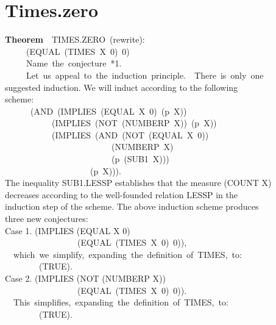 \documentclass[10pt]{book}
\newenvironment{pubasis}{\begin{flushleft}}{\end{flushleft}}
\newcommand{\axiomordefinition}[1]{\vspace{6pt}\Large\textsf{\textbf{#1}}\normalsize}
\begin{document}
\section{Times.zero}
\begin{pubasis}
\axiomordefinition{Theorem}~~TIMES.ZERO~(rewrite):\\
~~~~~(EQUAL~(TIMES~X~0)~0)\\

~~~~~Name~the~conjecture~*1.\\

~~~~~Let~us~appeal~to~the~induction~principle.~~There~is~only~one\\
suggested induction.  We will induct according to the following\\
scheme:\\
~~~~~~(AND~(IMPLIES~(EQUAL~X~0)~(p~X))\\
~~~~~~~~~~~(IMPLIES~(NOT~(NUMBERP~X))~(p~X))\\
~~~~~~~~~~~(IMPLIES~(AND~(NOT~(EQUAL~X~0))\\
~~~~~~~~~~~~~~~~~~~~~~~~~(NUMBERP~X)\\
~~~~~~~~~~~~~~~~~~~~~~~~~(p~(SUB1~X)))\\
~~~~~~~~~~~~~~~~~~~~(p~X))).\\
The inequality SUB1.LESSP establishes that the measure (COUNT X)\\
decreases according to the well-founded relation LESSP in the\\
induction step of the scheme.  The above induction scheme produces\\
three new conjectures:\\

Case 1.	(IMPLIES (EQUAL X 0)\\
~~~~~~~~~~~~~~~~~(EQUAL~(TIMES~X~0)~0)),\\

~~which~we~simplify,~expanding~the~definition~of~TIMES,~to:\\

~~~~~~~~(TRUE).\\

Case 2.	(IMPLIES (NOT (NUMBERP X))\\
~~~~~~~~~~~~~~~~~(EQUAL~(TIMES~X~0)~0)).\\

~~This~simplifies,~expanding~the~definition~of~TIMES,~to:\\

~~~~~~~~(TRUE).\\


\end{pubasis}
\end{document}
